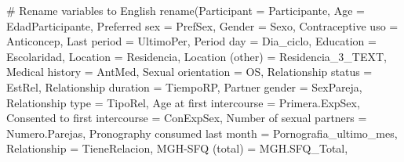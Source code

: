 \documentclass[
  bookmarksnumbered]{article}
\newenvironment{Shaded}{\begin{snugshade}}{\end{snugshade}}
\newcommand{\AttributeTok}[1]{\textcolor[rgb]{0.80,0.80,0.80}{#1}}
\newcommand{\CommentTok}[1]{\textcolor[rgb]{0.50,0.62,0.50}{#1}}
\newcommand{\FunctionTok}[1]{\textcolor[rgb]{0.94,0.94,0.56}{#1}}
\newcommand{\NormalTok}[1]{\textcolor[rgb]{0.80,0.80,0.80}{#1}}
\newcommand{\OtherTok}[1]{\textcolor[rgb]{0.94,0.94,0.56}{#1}}
\newcommand{\StringTok}[1]{\textcolor[rgb]{0.80,0.58,0.58}{#1}}
\begin{document}
\begin{Shaded}
\begin{Highlighting}[]
  \CommentTok{\# Rename variables to English}
  \FunctionTok{rename}\NormalTok{(}\AttributeTok{Participant =}\NormalTok{ Participante,}
         \AttributeTok{Age =}\NormalTok{ EdadParticipante,}
         \StringTok{\textasciigrave{}}\AttributeTok{Preferred sex}\StringTok{\textasciigrave{}}  \OtherTok{=}\NormalTok{ PrefSex,}
         \AttributeTok{Gender =}\NormalTok{ Sexo,}
         \StringTok{\textasciigrave{}}\AttributeTok{Contraceptive uso}\StringTok{\textasciigrave{}} \OtherTok{=}\NormalTok{ Anticoncep,}
         \StringTok{\textasciigrave{}}\AttributeTok{Last period}\StringTok{\textasciigrave{}} \OtherTok{=}\NormalTok{ UltimoPer,}
         \StringTok{\textasciigrave{}}\AttributeTok{Period day}\StringTok{\textasciigrave{}} \OtherTok{=}\NormalTok{ Dia\_ciclo,}
         \AttributeTok{Education =}\NormalTok{ Escolaridad,}
         \AttributeTok{Location =}\NormalTok{ Residencia,}
         \StringTok{\textasciigrave{}}\AttributeTok{Location (other)}\StringTok{\textasciigrave{}} \OtherTok{=}\NormalTok{ Residencia\_3\_TEXT,}
         \StringTok{\textasciigrave{}}\AttributeTok{Medical history}\StringTok{\textasciigrave{}} \OtherTok{=}\NormalTok{ AntMed,}
         \StringTok{\textasciigrave{}}\AttributeTok{Sexual orientation}\StringTok{\textasciigrave{}} \OtherTok{=}\NormalTok{ OS,}
         \StringTok{\textasciigrave{}}\AttributeTok{Relationship status}\StringTok{\textasciigrave{}} \OtherTok{=}\NormalTok{ EstRel,}
         \StringTok{\textasciigrave{}}\AttributeTok{Relationship duration}\StringTok{\textasciigrave{}} \OtherTok{=}\NormalTok{ TiempoRP,}
         \StringTok{\textasciigrave{}}\AttributeTok{Partner gender}\StringTok{\textasciigrave{}} \OtherTok{=}\NormalTok{ SexPareja,}
         \StringTok{\textasciigrave{}}\AttributeTok{Relationship type}\StringTok{\textasciigrave{}} \OtherTok{=}\NormalTok{ TipoRel,}
         \StringTok{\textasciigrave{}}\AttributeTok{Age at first intercourse}\StringTok{\textasciigrave{}} \OtherTok{=}\NormalTok{ Primera.ExpSex,}
         \StringTok{\textasciigrave{}}\AttributeTok{Consented to first intercourse}\StringTok{\textasciigrave{}} \OtherTok{=}\NormalTok{ ConExpSex,}
         \StringTok{\textasciigrave{}}\AttributeTok{Number of sexual partners}\StringTok{\textasciigrave{}} \OtherTok{=}\NormalTok{ Numero.Parejas,}
         \StringTok{\textasciigrave{}}\AttributeTok{Pronography consumed last month}\StringTok{\textasciigrave{}} \OtherTok{=}\NormalTok{ Pornografia\_ultimo\_mes,}
         \AttributeTok{Relationship =}\NormalTok{ TieneRelacion,}
         \StringTok{\textasciigrave{}}\AttributeTok{MGH{-}SFQ (total)}\StringTok{\textasciigrave{}} \OtherTok{=}\NormalTok{ MGH.SFQ\_Total,}

\end{Highlighting}
\end{Shaded}
\end{document}
